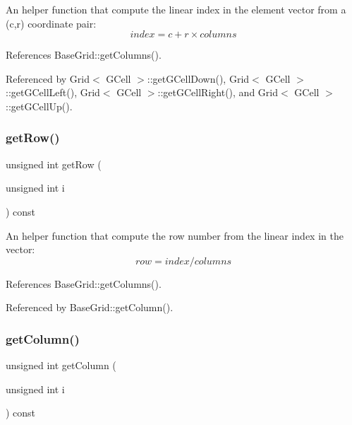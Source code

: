 An helper function that compute the linear index in the element vector from a {\ttfamily }(c,r) coordinate pair\+: \[ index = c + r \times columns \] 

References Base\+Grid\+::get\+Columns().



Referenced by Grid$<$ G\+Cell $>$\+::get\+G\+Cell\+Down(), Grid$<$ G\+Cell $>$\+::get\+G\+Cell\+Left(), Grid$<$ G\+Cell $>$\+::get\+G\+Cell\+Right(), and Grid$<$ G\+Cell $>$\+::get\+G\+Cell\+Up().

\mbox{\label{classKatabatic_1_1BaseGrid_a8108a276ab72226244d302fb1b59f3f1}} 
\subsubsection{\texorpdfstring{get\+Row()}{getRow()}}
{\footnotesize\ttfamily unsigned int get\+Row (\begin{DoxyParamCaption}\item[{unsigned int}]{i }\end{DoxyParamCaption}) const\hspace{0.3cm}{\ttfamily [inline]}}

An helper function that compute the row number from the linear index in the vector\+: \[ row = index / columns \] 

References Base\+Grid\+::get\+Columns().



Referenced by Base\+Grid\+::get\+Column().

\mbox{\label{classKatabatic_1_1BaseGrid_a21a8582c0c89a61d1963262fa053bc1b}} 
\subsubsection{\texorpdfstring{get\+Column()}{getColumn()}}
{\footnotesize\ttfamily unsigned int get\+Column (\begin{DoxyParamCaption}\item[{unsigned int}]{i }\end{DoxyParamCaption}) const\hspace{0.3cm}{\ttfamily [inline]}}

